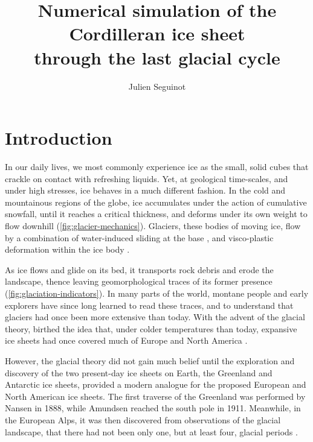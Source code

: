 \documentclass{article}
\title{Numerical simulation of the Cordilleran ice sheet \\
       through the last glacial cycle}
\author{Julien Seguinot}
\begin{document}

\maketitle
\linenumbers
\tableofcontents

\section{Introduction}

In our daily lives, we most commonly experience ice as the small, solid cubes
that crackle on contact with refreshing liquids. Yet, at geological
time-scales, and under high stresses, ice behaves in a much different fashion.
In the cold and mountainous regions of the globe, ice accumulates under the
action of cumulative snowfall, until it reaches a critical thickness, and
deforms under its own weight to flow downhill (\cref{fig:glacier-mechanics}).
Glaciers, these bodies of moving ice, flow by a combination of water-induced
sliding at the base \citep{Saussure.1796}, and visco-plastic deformation within
the ice body \citep{Forbes.1846b}.

As ice flows and glide on its bed, it transports rock debris and erode the
landscape, thence leaving geomorphological traces of its former presence
(\cref{fig:glaciation-indicators}). In many parts of the world, montane people
and early explorers have since long learned to read these traces, and to
understand that glaciers had once been more extensive than today. With the
advent of the glacial theory, birthed the idea that, under colder temperatures
than today, expansive ice sheets had once covered much of Europe and North
America \citep{Agassiz.1840}.

However, the glacial theory did not gain much belief until the exploration and
discovery of the two present-day ice sheets on Earth, the Greenland and
Antarctic ice sheets, provided a modern analogue for the proposed European and
North American ice sheets. The first traverse of the Greenland was performed by
Nansen in 1888, while Amundsen reached the south pole in 1911. Meanwhile, in
the European Alps, it was then discovered from observations of the glacial
landscape, that there had not been only one, but at least four, glacial periods
\citep{Penck.Bruckner.1909}.
\end{document}
